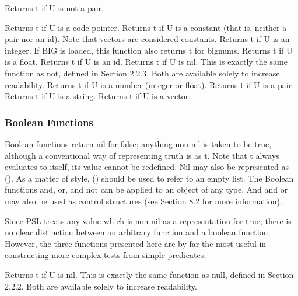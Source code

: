 {    Returns t if U is not a pair.
}

{    Returns t if U is a code-pointer.
}
{    Returns t if U is a constant (that is, neither a pair nor an
    id).  Note that vectors are considered constants.
}
{    Returns t if U is an  integer.    If  BIG  is  loaded,  this
    function also returns t for bignums.
}
{    Returns t if U is a float.
}
{    Returns t if U is an id.
}
{    Returns  t    if  U    is  nil.  This  is exactly  the  same
    function as  not, defined  in Section   2.2.3.   Both    are
    available  solely  to  increase  readability.
}
{    Returns t if U is a number (integer or float).
}
{    Returns t if U is a pair.
}
{    Returns t if U is a string.
}
{    Returns t if U is a vector.
}
\subsubsection{Boolean Functions}

Boolean  functions  return  nil for false; anything non-nil is
taken to be true, although a conventional  way  of  representing
truth  is  as  t.   Note  that t always evaluates to itself, its
value cannot be redefined.  Nil may also be represented  as  ().
As  a  matter  of  style, () should be used to refer to an empty
list.  The Boolean functions and, or, and not can be applied  to
an  object  of any type.  And and or may also be used as control
structures (see Section 8.2 for more information).

\noindent
Since  PSL  treats  any  value   which   is   non-nil   as   a
representation  for  true, there is no clear distinction between
an arbitrary function and a  boolean  function.    However,  the
three  functions  presented  here  are by far the most useful in
constructing more complex tests from simple predicates.


{    Returns t  if U  is  nil.  This   is  exactly    the    same
    function  as  null,  defined  in  Section  2.2.2.   Both are
    available solely to increase readability.
}

